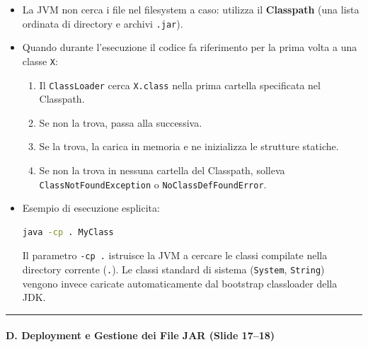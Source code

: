 \documentclass[11pt,a4paper]{article}
\newcommand{\passthrough}[1]{#1}
\providecommand{\tightlist}{\setlength{\itemsep}{0pt}\setlength{\parskip}{0pt}}
\begin{document}
\begin{enumerate}
  \begin{itemize}
  \item
    La JVM non cerca i file nel filesystem a caso: utilizza il
    \textbf{Classpath} (una lista ordinata di directory e archivi
    \passthrough{\lstinline!.jar!}).
  \item
    Quando durante l'esecuzione il codice fa riferimento per la prima
    volta a una classe \passthrough{\lstinline!X!}:

    \begin{enumerate}
    \def\labelenumii{\arabic{enumii}.}
    \tightlist
    \item
      Il \passthrough{\lstinline!ClassLoader!} cerca
      \passthrough{\lstinline!X.class!} nella prima cartella specificata
      nel Classpath.
    \item
      Se non la trova, passa alla successiva.
    \item
      Se la trova, la carica in memoria e ne inizializza le strutture
      statiche.
    \item
      Se non la trova in nessuna cartella del Classpath, solleva
      \passthrough{\lstinline!ClassNotFoundException!} o
      \passthrough{\lstinline!NoClassDefFoundError!}.
    \end{enumerate}
  \item
    Esempio di esecuzione esplicita:

\begin{lstlisting}[language=bash]
java -cp . MyClass
\end{lstlisting}

    Il parametro \passthrough{\lstinline!-cp .!} istruisce la JVM a
    cercare le classi compilate nella directory corrente
    (\passthrough{\lstinline!.!}). Le classi standard di sistema
    (\passthrough{\lstinline!System!}, \passthrough{\lstinline!String!})
    vengono invece caricate automaticamente dal bootstrap classloader
    della JDK.
  \end{itemize}
\end{enumerate}

\begin{center}\rule{0.5\linewidth}{0.5pt}\end{center}

\paragraph{D. Deployment e Gestione dei File JAR (Slide
17--18)}\label{d.-deployment-e-gestione-dei-file-jar-slide-1718}
\end{document}
